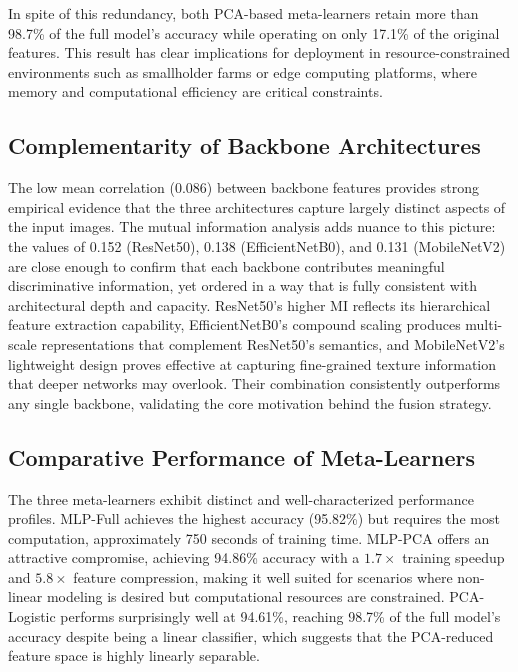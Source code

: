 \documentclass[pdflatex,sn-basic]{sn-jnl}
\begin{document}
In spite of this redundancy, both PCA-based meta-learners retain more than 98.7\% of the full model's accuracy while operating on only 17.1\% of the original features. This result has clear implications for deployment in resource-constrained environments such as smallholder farms or edge computing platforms, where memory and computational efficiency are critical constraints.

\subsection{Complementarity of Backbone Architectures}

The low mean correlation (0.086) between backbone features provides strong empirical evidence that the three architectures capture largely distinct aspects of the input images. The mutual information analysis adds nuance to this picture: the values of 0.152 (ResNet50), 0.138 (EfficientNetB0), and 0.131 (MobileNetV2) are close enough to confirm that each backbone contributes meaningful discriminative information, yet ordered in a way that is fully consistent with architectural depth and capacity. ResNet50's higher MI reflects its hierarchical feature extraction capability, EfficientNetB0's compound scaling produces multi-scale representations that complement ResNet50's semantics, and MobileNetV2's lightweight design proves effective at capturing fine-grained texture information that deeper networks may overlook. Their combination consistently outperforms any single backbone, validating the core motivation behind the fusion strategy.

\subsection{Comparative Performance of Meta-Learners}

The three meta-learners exhibit distinct and well-characterized performance profiles. MLP-Full achieves the highest accuracy (95.82\%) but requires the most computation, approximately 750 seconds of training time. MLP-PCA offers an attractive compromise, achieving 94.86\% accuracy with a $1.7\times$ training speedup and $5.8\times$ feature compression, making it well suited for scenarios where non-linear modeling is desired but computational resources are constrained. PCA-Logistic performs surprisingly well at 94.61\%, reaching 98.7\% of the full model's accuracy despite being a linear classifier, which suggests that the PCA-reduced feature space is highly linearly separable.
\end{document}
